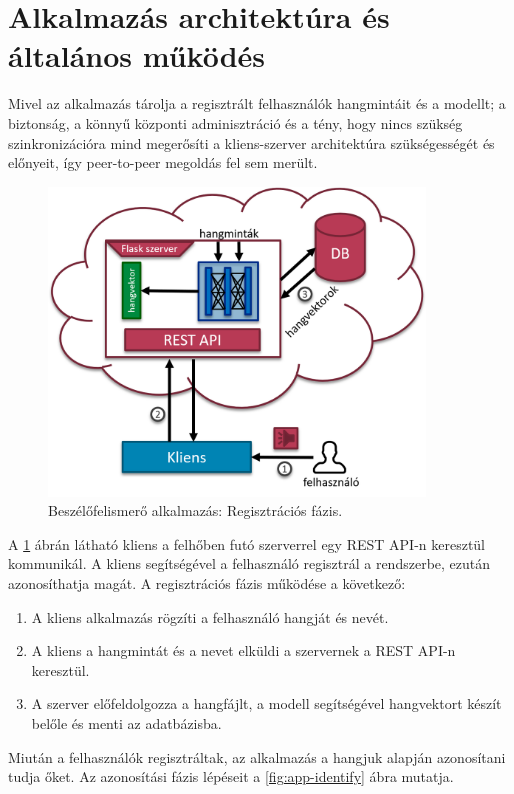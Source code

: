 \section{Alkalmazás architektúra és általános működés}

Mivel az alkalmazás tárolja a regisztrált felhasználók hangmintáit és a modellt; a biztonság, a könnyű központi adminisztráció és a tény, hogy nincs szükség szinkronizációra mind megerősíti a kliens-szerver architektúra szükségességét és előnyeit, így peer-to-peer megoldás fel sem merült.

\begin{figure}[!ht]
	\centering
	\includegraphics[width=100mm, keepaspectratio]{figures/app-register.png}
	\caption{Beszélőfelismerő alkalmazás: Regisztrációs fázis.}
	\label{fig:app-register}
\end{figure}

A \ref{fig:app-register} ábrán látható kliens a felhőben futó szerverrel egy REST API-n keresztül kommunikál. A kliens segítségével a felhasználó regisztrál a rendszerbe, ezután azonosíthatja magát. A regisztrációs fázis működése a következő:

\begin{enumerate}
	\item A kliens alkalmazás rögzíti a felhasználó hangját és nevét.
	\item A kliens a hangmintát és a nevet elküldi a szervernek a REST API-n keresztül.
	\item A szerver előfeldolgozza a hangfájlt, a modell segítségével hangvektort készít belőle és menti az adatbázisba. 
\end{enumerate}

Miután a felhasználók regisztráltak, az alkalmazás a hangjuk alapján azonosítani tudja őket. Az azonosítási fázis lépéseit a \ref{fig:app-identify} ábra mutatja.

